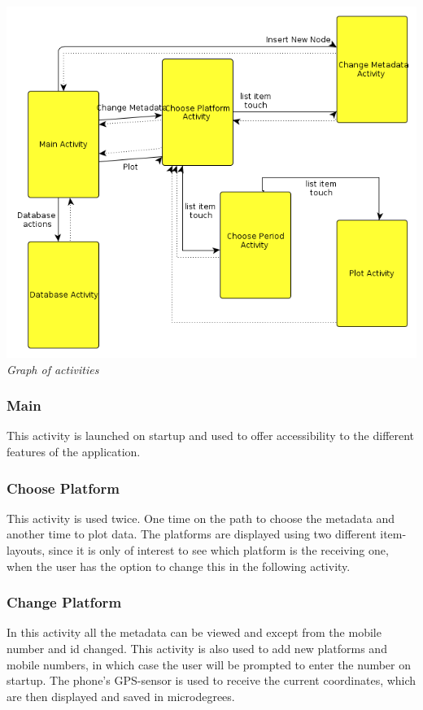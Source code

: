 \documentclass[11pt,oneside,a4paper]{scrartcl}
\begin{document}
\begin{center}
\includegraphics[scale=0.6]{picture/sensordata_activities.png}\\
\textit{Graph of activities}
\end{center}

\subsubsection{Main}
This activity is launched on startup and used to offer accessibility to the different features of the application.

\subsubsection{Choose Platform}
This activity is used twice. One time on the path to choose the metadata and another time to plot data. The platforms are displayed using two different item-layouts, since it is only of interest to see which  platform is the receiving one, when the user has the option to change this in the following activity. 

\subsubsection{Change Platform}
In this activity all the metadata can be viewed and except from the mobile number and id changed. This activity is also used to add new platforms and mobile numbers, in which case the user will be prompted to enter the number on startup. The phone's GPS-sensor is used to receive the current coordinates, which are then displayed and saved in microdegrees.
\end{document}

